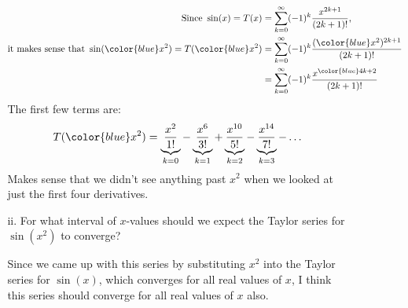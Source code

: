 \begin{enumerate}[leftmargin=0pt]
\begin{enumerate}
\begin{enumerate}
        \begin{red}
        \begin{align*}
            \text{Since } \sin(x) = T(x) &= \sum_{k=0}^{\infty} (-1)^{k} \frac{x^{2k+1}}{(2k+1)!}\text{,} \\
            \text{it makes sense that } \sin({\color{blue} x^2}) = T({\color{blue} x^2}) &= \sum_{k=0}^{\infty} (-1)^{k} \frac{({\color{blue} x^2})^{2k+1}}{(2k+1)!} \\
            &= \sum_{k=0}^{\infty} (-1)^{k} \frac{x^{\color{blue} 4k+2}}{(2k+1)!}
        \end{align*}
        The first few terms are:
        \[T({\color{blue}x^2}) = \underbrace{\dfrac{x^2}{1!}}_{k=0} - \underbrace{\dfrac{x^6}{3!}}_{k=1} + \underbrace{\dfrac{x^{10}}{5!}}_{k=2} - \underbrace{\dfrac{x^{14}}{7!}}_{k=3} - \ldots\]
        Makes sense that we didn't see anything past $x^2$ when we looked at just the first four derivatives.
        \end{red}

        \item[ii.] For what interval of $x$-values should we expect the Taylor series for $\sin(x^2)$ to converge?

        \begin{red}
            Since we came up with this series by substituting $x^2$ into the Taylor series for $\sin(x)$, which converges for all real values of $x$, I think this series should converge for all real values of $x$ also.
        \end{red}
    \end{enumerate}
    \end{enumerate}


\end{enumerate}
